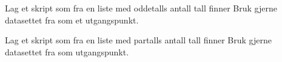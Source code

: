 




\opgt
\begin{comment}
	\op{opgsortlist}
	Definer listene 
	\alg{
	&\texttt{siffer = [2, 0, 3, 5, 7, 8, 6, 9, 4]}	\\
	&\texttt{bokstaver = ['b', 'f', 'd', 'c', 'e', 'a', 'g']
	}
	}
	Gjør følgende for hver av de to listene:
	\abc{
	\item Print elev
	}
\end{comment}
	
Lag et skript som fra en liste med oddetalls antall tall finner
Bruk gjerne datasettet fra  som et utgangspunkt.

Lag et skript som fra en liste med partalls antall tall finner
Bruk gjerne datasettet fra  som utgangspunkt.





